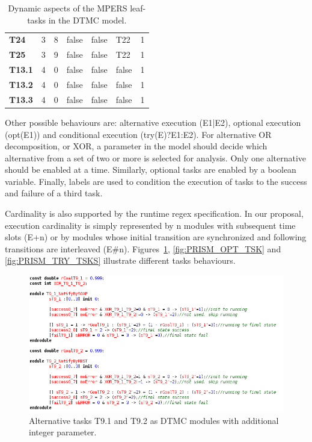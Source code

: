 \begin{table}[h]
{\begin{tabularx}{\textwidth}{@{}lllllll@{}}
\textbf{T24}   & 3                  & 8                  & false             & false                & T22                  & 1           \\
\textbf{T25}   & 3                  & 9                  & false             & false                & T22                  & 1           \\
\textbf{T13.1} & 4                  & 0                  & false             & false                & false                & 1           \\
\textbf{T13.2} & 4                  & 0                  & false             & false                & false                & 1           \\
\textbf{T13.3} & 4                  & 0                  & false             & false                & false                & 1           \\ \bottomrule
\end{tabularx}
\caption{Dynamic aspects of the MPERS leaf-tasks in the DTMC model.}
}
\end{table}

Other possible behaviours are: alternative execution (E1|E2), optional execution (opt(E1)) and conditional execution (try(E)?E1:E2). For alternative OR decomposition, or XOR, a parameter in the model should decide which alternative from a set of two or more is selected for analysis. Only one alternative should be enabled at a time. Similarly, optional tasks are enabled by a boolean variable. Finally, labels are used to condition the execution of tasks to the success and failure of a third task. 

Cardinality is also supported by the runtime regex specification. In our proposal, execution cardinality is simply represented by n modules with subsequent time slots (E+n) or by modules whose initial transition are synchronized and following transitions are interleaved (E\#n). Figures~\ref{fig:PRISM_ALT_TSKS}, \ref{fig:PRISM_OPT_TSK} and \ref{fig:PRISM_TRY_TSKS} illustrate different tasks behaviours.

\begin{figure}[ht]
\centering
\includegraphics[width=1\textwidth]{imgs/PRISM_ALT_TSKS.png}
\caption{Alternative tasks T9.1 and T9.2 as DTMC modules with additional integer parameter.}
\label{fig:PRISM_ALT_TSKS}
\end{figure}

